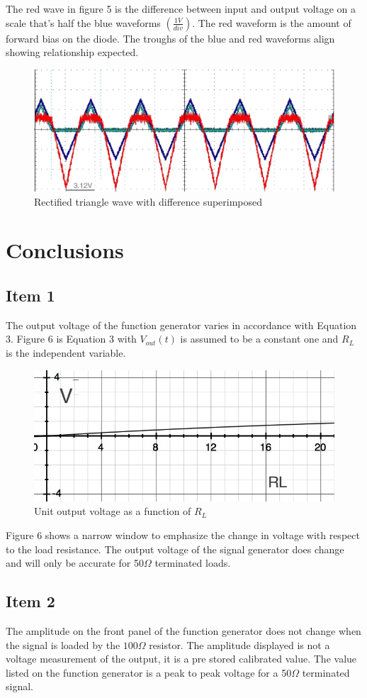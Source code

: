 \documentclass[11pt,journal]{IEEEtran}
\begin{document}
	The red wave in figure 5 is the difference between input and output voltage on a scale that's half the blue waveforms $(\frac{1V}{div})$. The red waveform is the amount of forward bias on the diode. The troughs of the blue and red
	waveforms align showing relationship expected. 
	
	\begin{figure}
		\includegraphics[width=.5\textwidth]{screenshot_28}
		\caption{Rectified triangle wave with difference superimposed}
	\end{figure}
	
	\section{Conclusions}
		\subsection{Item 1}
		The output voltage of the function generator varies in accordance with Equation 3. Figure 6 is Equation 3 with $V_{out}(t)$ is assumed to be a constant one and $R_L$
		is the independent variable.
		
		\begin{figure}[H]
			\includegraphics[width=.5\textwidth]{screenshot_30}
			\caption{Unit output voltage as a function of $R_L$}
		\end{figure}
		Figure 6 shows a narrow window to emphasize the change in voltage with respect to the load resistance. The output voltage of the signal generator does change and will only be accurate for 50$\Omega$ terminated loads.
		
		\subsection{Item 2}
		The amplitude on the front panel of the function generator does not change when the signal is loaded by the $100 \Omega$ resistor. The amplitude displayed is not a voltage measurement of the output, it is a pre stored
		calibrated value. The value listed on the function generator is a peak to peak voltage for a 50$\Omega$ terminated signal.
		
\end{document}
